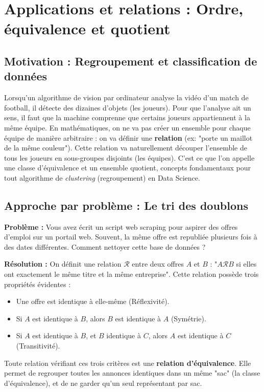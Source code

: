 \section{Applications et relations : Ordre, équivalence et quotient}

\subsection{Motivation : Regroupement et classification de données}
Lorsqu'un algorithme de vision par ordinateur analyse la vidéo d'un match de football, il détecte des dizaines d'objets (les joueurs). Pour que l'analyse ait un sens, il faut que la machine comprenne que certains joueurs appartiennent à la même équipe. 
En mathématiques, on ne va pas créer un ensemble pour chaque équipe de manière arbitraire : on va définir une \textbf{relation} (ex: "porte un maillot de la même couleur"). Cette relation va naturellement découper l'ensemble de tous les joueurs en sous-groupes disjoints (les équipes). C'est ce que l'on appelle une classe d'équivalence et un ensemble quotient, concepts fondamentaux pour tout algorithme de \textit{clustering} (regroupement) en Data Science.

\subsection{Approche par problème : Le tri des doublons}
\textbf{Problème :} Vous avez écrit un script web scraping pour aspirer des offres d'emploi sur un portail web. Souvent, la même offre est republiée plusieurs fois à des dates différentes. Comment nettoyer cette base de données ?

\textbf{Résolution :} On définit une relation $\mathcal{R}$ entre deux offres $A$ et $B$ : "$A \mathcal{R} B$ si elles ont exactement le même titre et la même entreprise".
Cette relation possède trois propriétés évidentes :
\begin{itemize}
    \item Une offre est identique à elle-même (Réflexivité).
    \item Si $A$ est identique à $B$, alors $B$ est identique à $A$ (Symétrie).
    \item Si $A$ est identique à $B$, et $B$ identique à $C$, alors $A$ est identique à $C$ (Transitivité).
\end{itemize}
Toute relation vérifiant ces trois critères est une \textbf{relation d'équivalence}. Elle permet de regrouper toutes les annonces identiques dans un même "sac" (la classe d'équivalence), et de ne garder qu'un seul représentant par sac.

